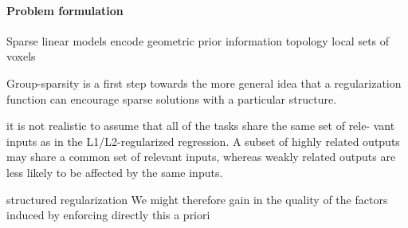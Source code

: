 \documentclass{article} %
\begin{document}


\paragraph{Problem formulation}

Sparse linear models
encode geometric prior information
topology
local sets of voxels

Group-sparsity is a first step towards the more general idea that
a regularization function can encourage sparse solutions with a particular structure. 

it is not realistic to assume that all of the tasks share the same set of rele- vant inputs as in the L1/L2-regularized regression. A subset of highly related outputs may share a common set of relevant inputs, whereas weakly related outputs are less likely to be affected by the same inputs.

structured regularization
We might therefore gain in the quality of the factors
induced by enforcing directly this a priori 
\end{document}
